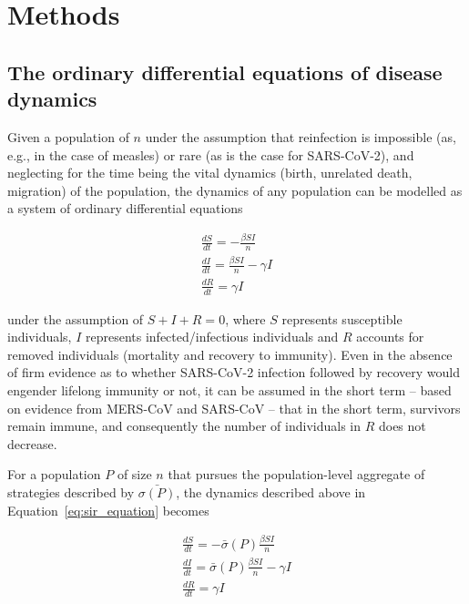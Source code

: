 \documentclass{article}
\begin{document}

\section{Methods} %
\label{sec:methods}

\subsection{The ordinary differential equations of disease dynamics} %
\label{sub:the_ordinary_differential_equations_of_disease_dynamics}

Given a population of $n$ under the assumption that reinfection is impossible (as, e.g., in the case of measles) or rare (as is the case for SARS-CoV-2\cite{edridge2020human,deng2020primary,bao2020reinfection}), and neglecting for the time being the vital dynamics (birth, unrelated death, migration) of the population, the dynamics of any population can be modelled as a system of ordinary differential equations

\begin{equation}
	\begin{aligned}
		\frac{dS}{dt} = - \frac{\beta S I}{n} 								\\
		\frac{dI}{dt} = \frac{\beta S I}{n} - \gamma I 						\\
		\frac{dR}{dt} = \gamma I
	\end{aligned}
	\label{eq:sir_equation}
\end{equation}

\noindent under the assumption of $S + I + R = 0$, where $S$ represents susceptible individuals, $I$ represents infected/infectious individuals and $R$ accounts for removed individuals (mortality and recovery to immunity). Even in the absence of firm evidence as to whether SARS-CoV-2 infection followed by recovery would engender lifelong immunity or not,\cite{roy2020covid,ota2020will,lin2020duration} it can be assumed in the short term -- based on evidence from MERS-CoV and SARS-CoV -- that in the short term, survivors remain immune,\cite{prompetchara2020immune} and consequently the number of individuals in $R$ does not decrease.

For a population $P$ of size $n$ that pursues the population-level aggregate of strategies described by $\bar{\sigma(P)}$, the dynamics described above in Equation~\eqref{eq:sir_equation} becomes

\begin{equation}
	\begin{aligned}
		\frac{dS}{dt} = - \bar{\sigma}(P) \frac{\beta S I}{n} 				\\
		\frac{dI}{dt} = \bar{\sigma}(P) \frac{\beta S I}{n} - \gamma I 		\\
		\frac{dR}{dt} = \gamma I
	\end{aligned}
	\label{eq:sir_strat_equation}
\end{equation}
\end{document}

